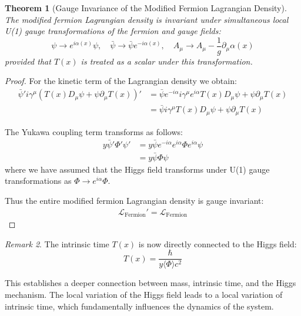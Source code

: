 \documentclass{article}
\newtheorem{theorem}{Theorem}[section]
\theoremstyle{definition}
\theoremstyle{remark}
\newtheorem{remark}[theorem]{Remark}
\newcommand{\Tfield}{T(x)} %
\newcommand{\DcovT}[1]{\Tfield D_\mu #1 + #1 \partial_\mu \Tfield}
\begin{document}
	\begin{theorem}[Gauge Invariance of the Modified Fermion Lagrangian Density]
		The modified fermion Lagrangian density is invariant under simultaneous local U(1) gauge transformations of the fermion and gauge fields:
		\begin{equation}
			\psi \rightarrow e^{i\alpha(x)}\psi, \quad \bar{\psi} \rightarrow \bar{\psi}e^{-i\alpha(x)}, \quad A_\mu \rightarrow A_\mu - \frac{1}{g}\partial_\mu \alpha(x)
		\end{equation}
		provided that $\Tfield$ is treated as a scalar under this transformation.
	\end{theorem}
	
	\begin{proof}
		For the kinetic term of the Lagrangian density we obtain:
		\begin{align}
			\bar{\psi}'i\gamma^\mu(\DcovT{\psi})' &= \bar{\psi}e^{-i\alpha}i\gamma^\mu e^{i\alpha}\DcovT{\psi} \\
			&= \bar{\psi}i\gamma^\mu \DcovT{\psi}
		\end{align}
		
		The Yukawa coupling term transforms as follows:
		\begin{align}
			y\bar{\psi}'\Phi'\psi' &= y\bar{\psi}e^{-i\alpha}e^{i\alpha}\Phi e^{i\alpha}\psi \\
			&= y\bar{\psi}\Phi\psi
		\end{align}
		where we have assumed that the Higgs field transforms under U(1) gauge transformations as $\Phi \rightarrow e^{i\alpha}\Phi$.
		
		Thus the entire modified fermion Lagrangian density is gauge invariant:
		\begin{align}
			\mathcal{L}_{\text{Fermion}}' = \mathcal{L}_{\text{Fermion}}
		\end{align}
	\end{proof}
	
	\begin{remark}
		The intrinsic time $\Tfield$ is now directly connected to the Higgs field:
		\begin{equation}
			\Tfield = \frac{\hbar}{y\langle\Phi\rangle c^2}
		\end{equation}
		
		This establishes a deeper connection between mass, intrinsic time, and the Higgs mechanism. The local variation of the Higgs field leads to a local variation of intrinsic time, which fundamentally influences the dynamics of the system.
	\end{remark}
	
\end{document}
